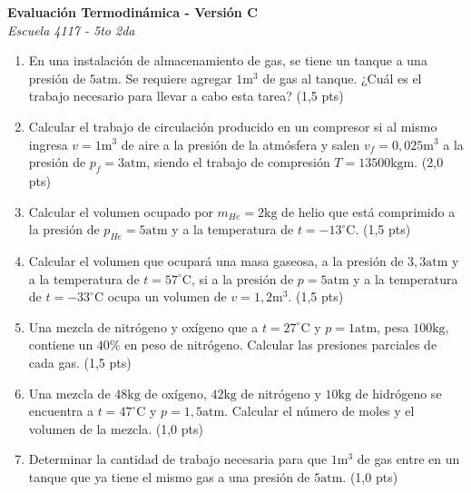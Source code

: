 \documentclass[a4paper,10pt]{article}
\newenvironment{versionexamen}[1]{
  \begin{minipage}[t]{0.48\textwidth}
    \textbf{Evaluación Termodinámica - Versión #1} \\
    \textit{Escuela 4117 - 5to 2da}
    \begin{enumerate}[label=\textbf{\arabic*.}, leftmargin=15pt, topsep=4pt, itemsep=4pt]
      \small
}{
    \end{enumerate}
    \vspace{0.4cm}
  \end{minipage}
}
\begin{document}
\begin{versionexamen}{C}
	\item En una instalación de almacenamiento de gas, se tiene un tanque a una presión de $5\text{atm}$. Se requiere agregar $1\text{m}^3$ de gas al tanque. ¿Cuál es el trabajo necesario para llevar a cabo esta tarea? (1,5 pts)
	\item Calcular el trabajo de circulación producido en un compresor si al mismo ingresa $v=1\text{m}^3$ de aire a la presión de la atmósfera y salen $v_f=0,025\text{m}^3$ a la presión de $p_f=3\text{atm}$, siendo el trabajo de compresión $T=13500\text{kgm}$. (2,0 pts)
	\item Calcular el volumen ocupado por $m_{He}=2\text{kg}$ de helio que está comprimido a la presión de $p_{He}=5\text{atm}$ y a la temperatura de $t=-13^\circ$C. (1,5 pts)
	\item Calcular el volumen que ocupará una masa gaseosa, a la presión de $3,3\text{atm}$ y a la temperatura de $t=57^\circ$C, si a la presión de $p=5\text{atm}$ y a la temperatura de $t=-33^\circ$C ocupa un volumen de $v=1,2\text{m}^3$. (1,5 pts)
	\item Una mezcla de nitrógeno y oxígeno que a $t=27^\circ$C y $p=1\text{atm}$, pesa $100\text{kg}$, contiene un $40\%$ en peso de nitrógeno. Calcular las presiones parciales de cada gas. (1,5 pts)
	\item Una mezcla de $48\text{kg}$ de oxígeno, $42\text{kg}$ de nitrógeno y $10\text{kg}$ de hidrógeno se encuentra a $t=47^\circ$C y $p=1,5\text{atm}$. Calcular el número de moles y el volumen de la mezcla. (1,0 pts)
	\item Determinar la cantidad de trabajo necesaria para que $1\text{m}^3$ de gas entre en un tanque que ya tiene el mismo gas a una presión de $5\text{atm}$. (1,0 pts)
\end{versionexamen}
\hfill
\end{document}
